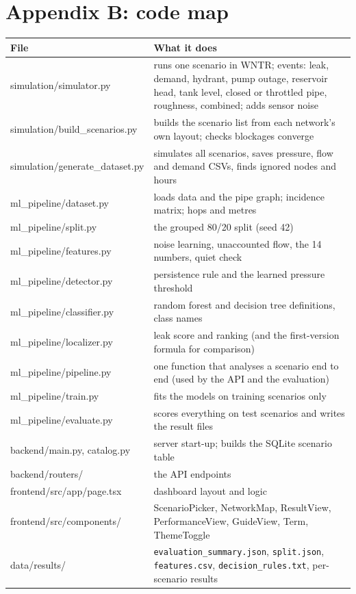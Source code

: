\documentclass[11pt,a4paper]{article}
\newcommand{\code}[1]{\texttt{#1}}
\begin{document}
\section*{Appendix B: code map}
\begin{center}\small\begin{tabularx}{\linewidth}{@{}>{\ttfamily}p{4.3cm}Y@{}}\toprule
File & What it does \\\midrule
simulation/simulator.py & runs one scenario in WNTR; events: leak, demand, hydrant, pump outage, reservoir head, tank level, closed or throttled pipe, roughness, combined; adds sensor noise \\
simulation/build\_scenarios.py & builds the scenario list from each network's own layout; checks blockages converge \\
simulation/generate\_dataset.py & simulates all scenarios, saves pressure, flow and demand CSVs, finds ignored nodes and hours \\
ml\_pipeline/dataset.py & loads data and the pipe graph; incidence matrix; hops and metres \\
ml\_pipeline/split.py & the grouped 80/20 split (seed 42) \\
ml\_pipeline/features.py & noise learning, unaccounted flow, the 14 numbers, quiet check \\
ml\_pipeline/detector.py & persistence rule and the learned pressure threshold \\
ml\_pipeline/classifier.py & random forest and decision tree definitions, class names \\
ml\_pipeline/localizer.py & leak score and ranking (and the first-version formula for comparison) \\
ml\_pipeline/pipeline.py & one function that analyses a scenario end to end (used by the API and the evaluation) \\
ml\_pipeline/train.py & fits the models on training scenarios only \\
ml\_pipeline/evaluate.py & scores everything on test scenarios and writes the result files \\
backend/main.py, catalog.py & server start-up; builds the SQLite scenario table \\
backend/routers/ & the API endpoints \\
frontend/src/app/page.tsx & dashboard layout and logic \\
frontend/src/components/ & ScenarioPicker, NetworkMap, ResultView, PerformanceView, GuideView, Term, ThemeToggle \\
data/results/ & \code{evaluation\_summary.json}, \code{split.json}, \code{features.csv}, \code{decision\_rules.txt}, per-scenario results \\\bottomrule\end{tabularx}\end{center}
\end{document}
